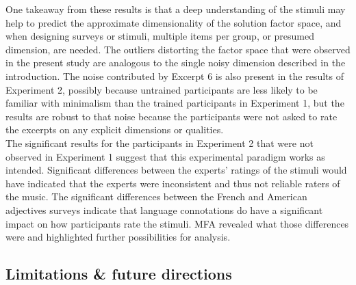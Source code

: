 \documentclass[
  english,
  man,floatsintext]{apa6}
\begin{document}
One takeaway from these results is that a deep understanding of the stimuli may help to predict the approximate dimensionality of the solution factor space, and when designing surveys or stimuli, multiple items per group, or presumed dimension, are needed. The outliers distorting the factor space that were observed in the present study are analogous to the single noisy dimension described in the introduction. The noise contributed by Excerpt 6 is also present in the results of Experiment 2, possibly because untrained participants are less likely to be familiar with minimalism than the trained participants in Experiment 1, but the results are robust to that noise because the participants were not asked to rate the excerpts on any explicit dimensions or qualities.\\
The significant results for the participants in Experiment 2 that were not observed in Experiment 1 suggest that this experimental paradigm works as intended. Significant differences between the experts' ratings of the stimuli would have indicated that the experts were inconsistent and thus not reliable raters of the music. The significant differences between the French and American adjectives surveys indicate that language connotations do have a significant impact on how participants rate the stimuli. MFA revealed what those differences were and highlighted further possibilities for analysis.

\hypertarget{limitations-future-directions}{%
\subsection{Limitations \& future directions}\label{limitations-future-directions}}
\end{document}
